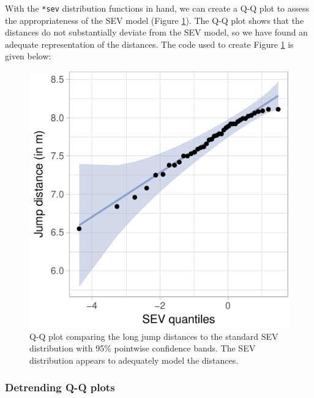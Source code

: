 With the \texttt{*sev} distribution functions in hand, we can create a
Q-Q plot to assess the appropriateness of the SEV model (Figure
\ref{fig:sev-qq}). The Q-Q plot shows that the distances do not
substantially deviate from the SEV model, so we have found an adequate
representation of the distances. The code used to create Figure
\ref{fig:sev-qq} is given below:

\begin{Schunk}
\begin{figure}

{\centering \includegraphics[width=0.45\linewidth]{loy-figures/sev-qq-1} 

}

\caption[Q-Q plot comparing the long jump distances to the standard SEV distribution with 95\% pointwise confidence bands]{Q-Q plot comparing the long jump distances to the standard SEV distribution with 95\% pointwise confidence bands. The SEV distribution appears to adequately model the distances.}\label{fig:sev-qq}
\end{figure}
\end{Schunk}

\FloatBarrier

\subsubsection{Detrending Q-Q plots}\label{detrending-q-q-plots}

